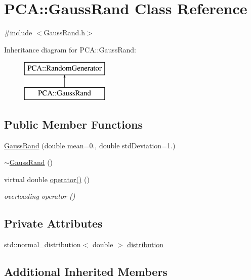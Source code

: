 \hypertarget{class_p_c_a_1_1_gauss_rand}{}\section{P\+CA\+:\+:Gauss\+Rand Class Reference}
\label{class_p_c_a_1_1_gauss_rand}


{\ttfamily \#include $<$Gauss\+Rand.\+h$>$}

Inheritance diagram for P\+CA\+:\+:Gauss\+Rand\+:\begin{figure}[H]
\begin{center}
\leavevmode
\includegraphics[height=2.000000cm]{class_p_c_a_1_1_gauss_rand}
\end{center}
\end{figure}
\subsection*{Public Member Functions}
\begin{DoxyCompactItemize}
\item 
\hyperlink{class_p_c_a_1_1_gauss_rand_a981fa1a94f0a38702117cc17c3cee549}{Gauss\+Rand} (double mean=0., double std\+Deviation=1.)
\item 
\hyperlink{class_p_c_a_1_1_gauss_rand_aa5419fd06c7192c1d953f90bc38cff94}{$\sim$\+Gauss\+Rand} ()
\item 
virtual double \hyperlink{class_p_c_a_1_1_gauss_rand_a594130952a4999972f08b429ea6af959}{operator()} ()
\begin{DoxyCompactList}\small\item\em overloading operator () \end{DoxyCompactList}\end{DoxyCompactItemize}
\subsection*{Private Attributes}
\begin{DoxyCompactItemize}
\item 
std\+::normal\+\_\+distribution$<$ double $>$ \hyperlink{class_p_c_a_1_1_gauss_rand_a2a3c5494238db1cc94c2408227d9dbed}{distribution}
\end{DoxyCompactItemize}
\subsection*{Additional Inherited Members}


